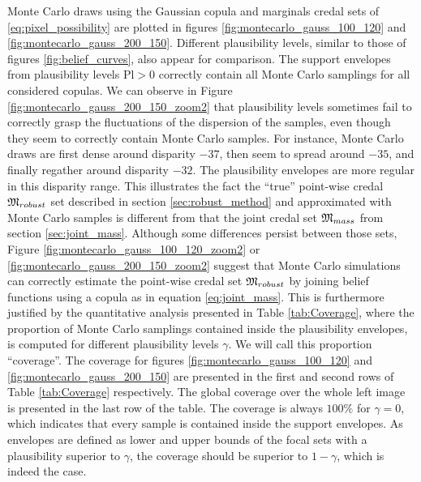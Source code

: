 Monte Carlo draws using the Gaussian copula and marginals credal sets of \ref{eq:pixel_possibility} are plotted in figures \ref{fig:montecarlo_gauss_100_120} and \ref{fig:montecarlo_gauss_200_150}. Different plausibility levels, similar to those of figures \ref{fig:belief_curves}, also appear for comparison. The support envelopes from plausibility levels $\mathrm{Pl}>0$ correctly contain all Monte Carlo samplings for all considered copulas. We can observe in Figure \ref{fig:montecarlo_gauss_200_150_zoom2} that plausibility levels sometimes fail to correctly grasp the fluctuations of the dispersion of the samples, even though they seem to correctly contain Monte Carlo samples. For instance, Monte Carlo draws are first dense around disparity $-37$, then seem to spread around $-35$, and finally regather around disparity $-32$. The plausibility envelopes are more regular in this disparity range. This illustrates the fact the ``true'' point-wise credal ${\mathfrak{M}}_{robust}$ set described in section \ref{sec:robust_method} and approximated with Monte Carlo samples is different from that the joint credal set ${\mathfrak{M}}_{mass}$ from section \ref{sec:joint_mass}. Although some differences persist between those sets, Figure \ref{fig:montecarlo_gauss_100_120_zoom2} or \ref{fig:montecarlo_gauss_200_150_zoom2} suggest that Monte Carlo simulations can correctly estimate the point-wise credal set ${\mathfrak{M}}_{robust}$ by joining belief functions using a copula as in equation \eqref{eq:joint_mass}. This is furthermore justified by the  quantitative analysis presented in Table \ref{tab:Coverage}, where the proportion of Monte Carlo samplings contained inside the plausibility envelopes, is computed for different plausibility levels $\gamma$. We will call this proportion ``coverage''. The coverage for figures \ref{fig:montecarlo_gauss_100_120} and \ref{fig:montecarlo_gauss_200_150} are presented in the first and second rows of Table \ref{tab:Coverage} respectively. The global coverage over the whole left image is presented in the last row of the table. The coverage is always $100\%$ for $\gamma=0$, which indicates that every sample is contained inside the support envelopes.  As envelopes are defined as lower and upper bounds of the focal sets with a plausibility superior to $\gamma$, the coverage should be superior to $1-\gamma$, which is indeed the case.

